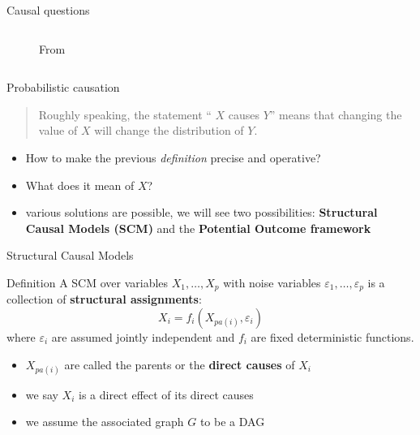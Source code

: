 \documentclass{beamer}
\begin{document}
\begin{frame}{Causal questions}
\begin{columns}
\begin{column}{0.5\textwidth}
{\begin{figure}
	  \caption{From \cite{Christiansen03042022}} 
	\end{figure}
      }
    \end{column}
  \end{columns}

\end{frame}


\begin{frame}{Probabilistic causation}

  \begin{block}{\citep[][AoS, Chapter 16]{wasserman2013all}}
    \begin{quote}
	Roughly speaking, the statement `` $X$ causes $Y$'' means that 
	changing the value of $X$ will change the distribution of $Y$.
      \end{quote}
  \end{block}
  \begin{itemize}
    \item<2-> How to make the previous \emph{definition} precise and operative? 
    \item<3-> What does it mean  of $X$? 
    \item<4-> various solutions are possible, we will see two possibilities:
      \textbf{Structural Causal Models (SCM)} and the \textbf{Potential Outcome framework}
  \end{itemize}
\end{frame}

\begin{frame}{Structural Causal Models}
	\begin{block}{Definition \citep{peters2017elements}}
 A SCM over variables $X_1, \ldots, X_p$ with noise variables $\varepsilon_1, \ldots, \varepsilon_p$ is 
	 a collection of \textbf{structural assignments}: 
	   \[ X_i =  f_i(X_{pa(i)}, \varepsilon_i) \]
	   where $\varepsilon_i$ are assumed jointly independent and $f_i$ are fixed deterministic functions.  
	 \end{block}
	 \begin{itemize}
		 \item $X_{pa(i)}$ are called the parents or the \textbf{direct causes} of $X_i$
		 \item we say $X_i$ is a direct effect of its direct causes 
		 \item we assume the associated graph $G$ to be a DAG 
	 \end{itemize}
\end{frame}
\end{document}

